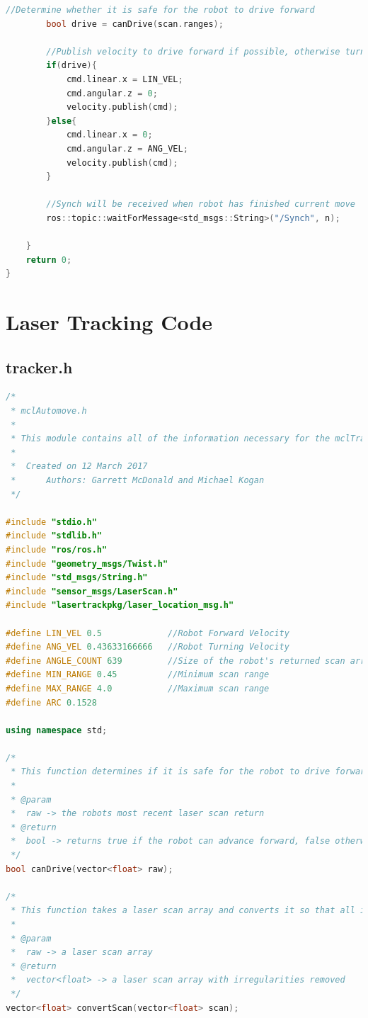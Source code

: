 \documentclass{article}
\begin{document}
\begin{appendices}
\begin{lstlisting}[language=C++]
		//Determine whether it is safe for the robot to drive forward
		bool drive = canDrive(scan.ranges);
		
		//Publish velocity to drive forward if possible, otherwise turn 
		if(drive){
			cmd.linear.x = LIN_VEL;
			cmd.angular.z = 0;
			velocity.publish(cmd);
		}else{
			cmd.linear.x = 0;
			cmd.angular.z = ANG_VEL;
			velocity.publish(cmd);
		}

		//Synch will be received when robot has finished current move
		ros::topic::waitForMessage<std_msgs::String>("/Synch", n);

	}	
	return 0;
}
\end{lstlisting}

\section{Laser Tracking Code}
\subsection{tracker.h}
\begin{lstlisting}[language=C++]
/*
 * mclAutomove.h
 *
 * This module contains all of the information necessary for the mclTracker ROS executable
 *
 * 	Created on 12 March 2017
 *		Authors: Garrett McDonald and Michael Kogan
 */

#include "stdio.h"
#include "stdlib.h"
#include "ros/ros.h"
#include "geometry_msgs/Twist.h"
#include "std_msgs/String.h"
#include "sensor_msgs/LaserScan.h"
#include "lasertrackpkg/laser_location_msg.h"

#define LIN_VEL 0.5				//Robot Forward Velocity
#define ANG_VEL 0.43633166666	//Robot Turning Velocity
#define ANGLE_COUNT 639			//Size of the robot's returned scan array
#define MIN_RANGE 0.45			//Minimum scan range
#define MAX_RANGE 4.0			//Maximum scan range
#define ARC 0.1528

using namespace std;

/*
 * This function determines if it is safe for the robot to drive forward
 *
 * @param
 *  raw -> the robots most recent laser scan return
 * @return
 *  bool -> returns true if the robot can advance forward, false otherwise
 */
bool canDrive(vector<float> raw);

/*
 * This function takes a laser scan array and converts it so that all irregular values are replaced by the max range
 *
 * @param
 *  raw -> a laser scan array
 * @return
 *  vector<float> -> a laser scan array with irregularities removed
 */
vector<float> convertScan(vector<float> scan);
\end{lstlisting}


\end{appendices}
\end{document}
